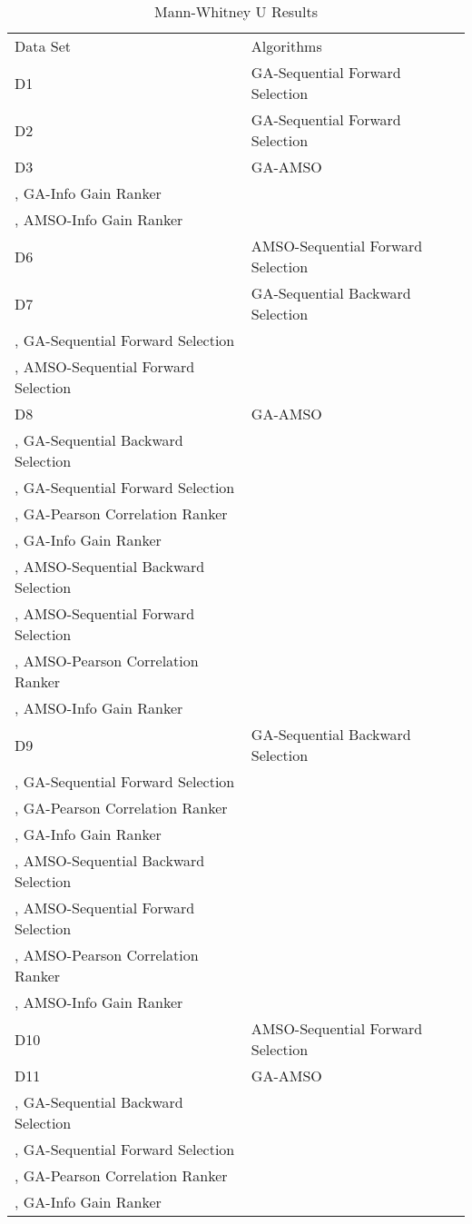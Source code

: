 \begin{table}
\caption{Mann-Whitney U Results}
\label{tbl:mann:whitney:u}
\begin{tabular}{ll}
\noalign{\smallskip}\hline\noalign{\smallskip}
Data Set & Algorithms \\
\noalign{\smallskip}\hline
D1&GA-Sequential Forward Selection\\
D2&GA-Sequential Forward Selection\\
D3&GA-AMSO\\
, GA-Info Gain Ranker\\
, AMSO-Info Gain Ranker\\
D6&AMSO-Sequential Forward Selection\\
D7&GA-Sequential Backward Selection\\
, GA-Sequential Forward Selection\\
, AMSO-Sequential Forward Selection\\
D8&GA-AMSO\\
, GA-Sequential Backward Selection\\
, GA-Sequential Forward Selection\\
, GA-Pearson Correlation Ranker\\
, GA-Info Gain Ranker\\
, AMSO-Sequential Backward Selection\\
, AMSO-Sequential Forward Selection\\
, AMSO-Pearson Correlation Ranker\\
, AMSO-Info Gain Ranker\\
D9&GA-Sequential Backward Selection\\
, GA-Sequential Forward Selection\\
, GA-Pearson Correlation Ranker\\
, GA-Info Gain Ranker\\
, AMSO-Sequential Backward Selection\\
, AMSO-Sequential Forward Selection\\
, AMSO-Pearson Correlation Ranker\\
, AMSO-Info Gain Ranker\\
D10&AMSO-Sequential Forward Selection\\
D11&GA-AMSO\\
, GA-Sequential Backward Selection\\
, GA-Sequential Forward Selection\\
, GA-Pearson Correlation Ranker\\
, GA-Info Gain Ranker\\

\end{tabular}
\end{table}
